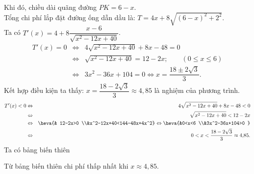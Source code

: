 \begin{bt}
{		 Khi đó, chiều dài quãng đường $PK = 6-x$.\\
		Tổng chi phí lắp đặt  đường ống dẫn dầu là: $T = 4x+8\sqrt{(6-x)^2+2^2}$.\\
		 Ta có $T'(x) = 4+8 \dfrac{x-6}{\sqrt{x^2-12x+40}}$.
		\begin{eqnarray*}
			T'(x)=0 &\Leftrightarrow& 4\sqrt{x^2-12x+40}+8x-48=0 \\ 
			 &\Leftrightarrow& \sqrt{x^2-12x+40}=12-2x; \qquad \left(0\leq x\leq 6 \right) \\
			&\Leftrightarrow&  3x^2-36x+104=0 \Leftrightarrow x=\dfrac{18\pm2\sqrt{3}}{3}.
		\end{eqnarray*}
		Kết  hợp điều kiện ta thấy: $x=\dfrac{18-2\sqrt{3}}{3} \approx 4,85$ là nghiệm của phương trình.
		 \allowdisplaybreaks
		\begin{eqnarray*}
			T'(x)<0 &\Leftrightarrow&  4\sqrt{x^2-12x+40}+8x-48<0 \\
			&\Leftrightarrow&  \sqrt{x^2-12x+40}<12-2x \\
			&\Leftrightarrow& \heva{& 12-2x>0 \\&x^2-12x+40<144-48x+4x^2} 
			\Leftrightarrow \heva{&0<x<6 \\&3x^2-36x+104>0  } \\
			&\Leftrightarrow& 0<x<\dfrac{18-2\sqrt{3}}{3}\approx 4{,}85. 
		\end{eqnarray*}
		Ta có bảng  biến thiên
		\begin{center}
		\end{center}
		 Từ bảng biến thiên chi phí thấp nhất khi $x\approx 4{,}85$.
	} 
\end{bt}

